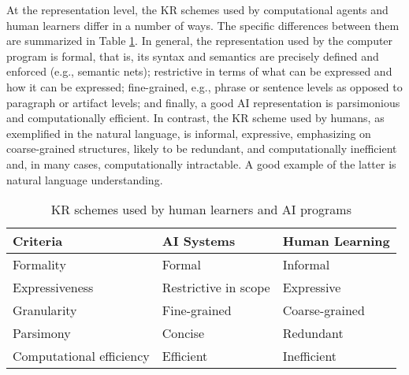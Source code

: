 At the representation level, the KR schemes used by computational agents
and human learners differ in a number of ways. The specific differences
between them are summarized in Table \ref{tab:kr-schemes}. In general, the
representation used by the computer program is formal, that is, its syntax
and semantics are precisely defined and enforced (e.g., semantic nets);
restrictive in terms of what can be expressed and how it can be expressed;
fine-grained, e.g., phrase or sentence levels as opposed to paragraph or
artifact levels; and finally, a good AI representation is parsimonious and
computationally efficient. In contrast, the KR scheme used by humans, as
exemplified in the natural language, is informal, expressive, emphasizing
on coarse-grained structures, likely to be redundant, and computationally
inefficient and, in many cases, computationally intractable. A good example
of the latter is natural language understanding.

\small
\begin{table}[hbt]
  \caption{KR schemes used by human learners and AI programs}
  \begin{center}
    \begin{tabular} {||l|p{1.8in}|p{1.8in}||} \hline   
      {\bf Criteria} & {\bf AI Systems} & {\bf Human Learning} \\
      \hline \hline
      
      Formality & Formal & Informal \\ \hline
      
      Expressiveness & Restrictive in scope & Expressive \\ \hline
      
      Granularity & Fine-grained & Coarse-grained \\ \hline
      
      Parsimony & Concise & Redundant \\ \hline
      
      Computational efficiency & Efficient & Inefficient \\ \hline
    \end{tabular}
   \end{center}
    \label{tab:kr-schemes}
\end{table}
\normalsize
{}

